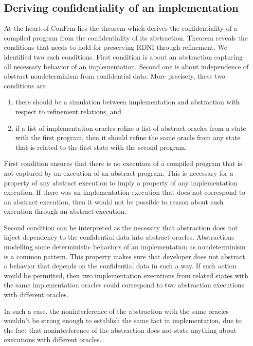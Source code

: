 \subsection{Deriving confidentiality of an implementation}
At the heart of ConFrm lies the theorem which derives the confidentiality of a compiled program from the confidentiality of its abstraction. Theorem reveals the conditions that needs to hold for preserving RDNI through refinement. We identified two such conditions. First condition is about an abstraction capturing all necessary behavior of an implementation. Second one is about independence of abstract nondeterminism from confidential data. More precisely, these two conditions are

\begin{enumerate}
    \item there should be a simulation between implementation and abstraction with respect to refinement relations, and
    \item if a list of implementation oracles refine a list of abstract oracles from a state with the first program, then it should refine the same oracle from any state that is related to the first state with the second program.
\end{enumerate}

First condition ensures that there is no execution of a compiled program that is not captured by an execution of an abstract program. This is necessary for a property of any abstract execution to imply a property of any implementation execution. If there was an implementation execution that does not correspond to an abstract execution, then it would not be possible to reason about such execution through an abstract execution.

Second condition can be interpreted as the necessity that abstraction does not inject dependency to the confidential data into abstract oracles. Abstractions modelling some deterministic behaviors of an implementation as nondeterminism is a common pattern. This property makes sure that developer does not abstract a behavior that depends on the confidential data in such a way. If such action would be permitted, then two implementation executions from related states with the same implementation oracles could correspond to two abstraction executions with different oracles.

In such a case, the noninterference of the abstraction with the same oracles wouldn't be strong enough to establish the same fact in implementation, due to the fact that noninterference of the abstraction does not state anything about executions with different oracles.

